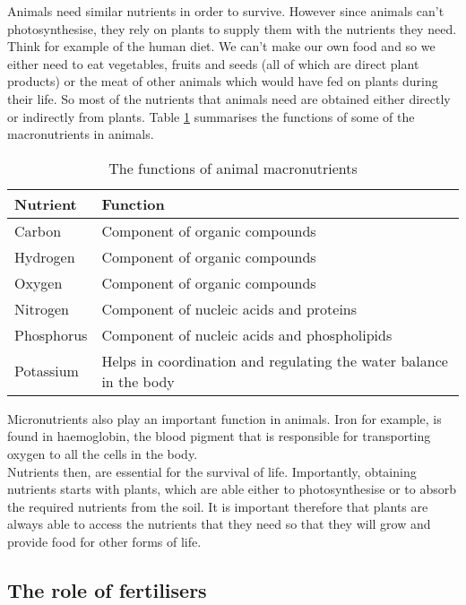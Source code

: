 Animals need similar nutrients in order to survive. However since animals can't photosynthesise, they rely on plants to supply them with the nutrients they need. Think for example of the human diet. We can't make our own food and so we either need to eat vegetables, fruits and seeds (all of which are direct plant products) or the meat of other animals which would have fed on plants during their life. So most of the nutrients that animals need are obtained either directly or indirectly from plants. Table \ref{tab:animal macronutrients} summarises the functions of some of the macronutrients in animals.\\

\begin{table}[h]
\begin{center}
\caption{The functions of animal macronutrients}
\label{tab:animal macronutrients}
\begin{tabular}{|p{3.5cm}|p{5cm}|}\hline
\textbf{Nutrient} & \textbf{Function}\\\hline
Carbon & Component of organic compounds \\\hline
Hydrogen & Component of organic compounds \\\hline
Oxygen & Component of organic compounds \\\hline
Nitrogen & Component of nucleic acids and proteins\\\hline
Phosphorus & Component of nucleic acids and phospholipids \\\hline
Potassium & Helps in coordination and regulating the water balance in the body \\\hline
\end{tabular}
\end{center}
\end{table}

Micronutrients also play an important function in animals. Iron for example, is found in haemoglobin, the blood pigment that is responsible for transporting oxygen to all the cells in the body.\\

Nutrients then, are essential for the survival of life. Importantly, obtaining nutrients starts with plants, which are able either to photosynthesise or to absorb the required nutrients from the soil. It is important therefore that plants are always able to access the nutrients that they need so that they will grow and provide food for other forms of life.

\subsection{The role of fertilisers}

